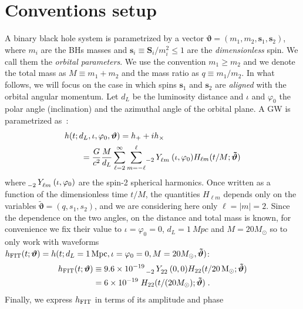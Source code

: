 \section{Conventions setup}
\label{sec:setup}
A binary black hole system is parametrized by a vector $ \boldsymbol{\vartheta} = (m_1,m_2, \mathbf{s}_1,\mathbf{s}_2) $, where $m_i$ are the 
BHs masses and $\mathbf{s}_i \equiv \mathbf{S}_i/m_i^2 \leq 1$ are the 
\textit{dimensionless} spin. We call them the \textit{orbital parameters}.
We use the convention $m_1\geq m_2$ and we denote the total mass as $M\equiv m_1+m_2$
and the mass ratio as $q\equiv m_1/m_2$.
In what follows, we will focus on the case in which spins $\mathbf{s}_1$ and $\mathbf{s}_2$ are \textit{aligned} with the orbital angular momentum. 
Let $d_L$ be the luminosity distance and $\iota$ and $\varphi_0$ the polar angle (inclination) and the azimuthal angle of the orbital plane.
A GW is parametrized as~\cite[Eq.~II.6]{ajith2011data}:
\begin{align} \label{eq:h_parametrization}
	&h(t; d_L,\iota,\varphi_0, \boldsymbol{\vartheta}) = h_+ + i h_\times \nonumber \\
		&\qquad= \frac{G}{c^2} \frac{M}{d_L}\sum_{\ell = 2}^{\infty} \sum_{m = -\ell}^{\ell} \tensor[_{-2}]{Y}{_{\ell m}}(\iota, \varphi_0) H_{\ell m}(t/M; \boldsymbol{\tilde{\vartheta}})
\end{align}
where $\tensor[_{-2}]{Y}{_{\ell m}}(\iota, \varphi_0)$ are the spin-2 spherical harmonics. 
Once written as a function of the dimensionless time $t/M$, the quantities $H_{\ell m}$ 
depends only on the variables $\tilde{\boldsymbol{\vartheta}} = (q, s_1, s_2)$, and we
are considering here only $\ell=|m|=2$.
Since the dependence on the two angles, on the distance and total mass is known, 
for convenience we fix their value to ${\iota = \varphi_0 = 0}$, ${d_L = \SI{1}{Mpc}}$ 
and $M = 20M_\odot$ so to only work with waveforms ${h_{\rm FIT}(t; \boldsymbol{\vartheta}) = h(t; d_L = \SI{1}{Mpc}, \iota = \varphi_0 = 0, 
M = 20M_\odot, \boldsymbol{\tilde{\vartheta}}) }$:
\begin{align}  
	h_{\rm FIT}(t; \boldsymbol{\vartheta}) &\equiv 9.6 \times 10^{-19} \; \tensor[_{-2}]{Y}{_{2 2}}(0,0) H_{22}(t/\SI{20}{M_\odot}; \boldsymbol{\tilde{\vartheta}})  \nonumber \\
	&= 6 \times 10^{-19} \; H_{22}(t/(20M_\odot); \boldsymbol{\tilde{\vartheta}}) \label{eq:h_std} \; .
\end{align}
Finally, we express  $h_{\rm FIT}$ in terms of its amplitude and phase
